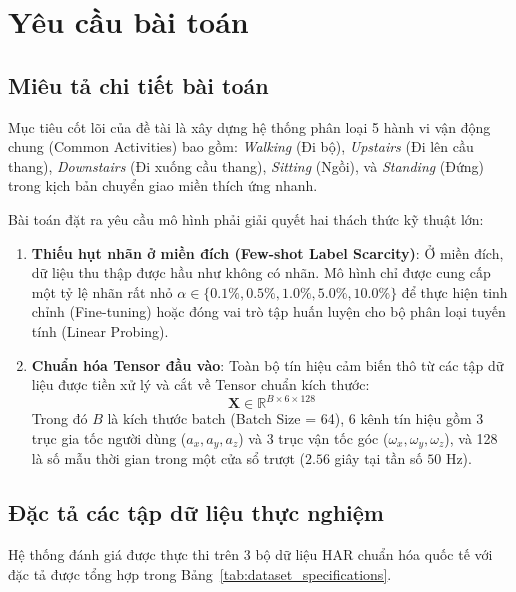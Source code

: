 \section{Yêu cầu bài toán}

\subsection{Miêu tả chi tiết bài toán}
Mục tiêu cốt lõi của đề tài là xây dựng hệ thống phân loại 5 hành vi vận động chung (Common Activities) bao gồm: \textit{Walking} (Đi bộ), \textit{Upstairs} (Đi lên cầu thang), \textit{Downstairs} (Đi xuống cầu thang), \textit{Sitting} (Ngồi), và \textit{Standing} (Đứng) trong kịch bản chuyển giao miền thích ứng nhanh.

Bài toán đặt ra yêu cầu mô hình phải giải quyết hai thách thức kỹ thuật lớn:
\begin{enumerate}
    \item \textbf{Thiếu hụt nhãn ở miền đích (Few-shot Label Scarcity)}: Ở miền đích, dữ liệu thu thập được hầu như không có nhãn. Mô hình chỉ được cung cấp một tỷ lệ nhãn rất nhỏ $\alpha \in \{0.1\%, 0.5\%, 1.0\%, 5.0\%, 10.0\%\}$ để thực hiện tinh chỉnh (Fine-tuning) hoặc đóng vai trò tập huấn luyện cho bộ phân loại tuyến tính (Linear Probing).
    \item \textbf{Chuẩn hóa Tensor đầu vào}: Toàn bộ tín hiệu cảm biến thô từ các tập dữ liệu được tiền xử lý và cắt về Tensor chuẩn kích thước:
    \begin{equation}
        \mathbf{X} \in \mathbb{R}^{B \times 6 \times 128}
    \end{equation}
    Trong đó $B$ là kích thước batch (Batch Size = 64), 6 kênh tín hiệu gồm 3 trục gia tốc người dùng ($a_x, a_y, a_z$) và 3 trục vận tốc góc ($\omega_x, \omega_y, \omega_z$), và 128 là số mẫu thời gian trong một cửa sổ trượt ($2.56$ giây tại tần số $50\text{ Hz}$).
\end{enumerate}

\subsection{Đặc tả các tập dữ liệu thực nghiệm}
Hệ thống đánh giá được thực thi trên 3 bộ dữ liệu HAR chuẩn hóa quốc tế với đặc tả được tổng hợp trong Bảng~\ref{tab:dataset_specifications}.

